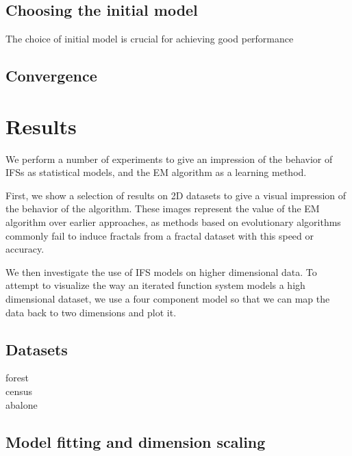 \documentclass[10pt,a4paper,oneside]{article}
\theoremstyle{definition}
\begin{document}

\subsection*{Choosing the initial model}

The choice of initial model is crucial for achieving good performance


\subsection*{Convergence}

\section*{Results}

We perform a number of experiments to give an impression of the behavior of IFSs as statistical models, and the EM algorithm as a learning method. 

First, we show a selection of results on 2D datasets to give a visual impression of the behavior of the algorithm. These images represent the value of the EM algorithm over earlier approaches, as methods based on evolutionary algorithms commonly fail to induce fractals from a fractal dataset with this speed or accuracy.

We then investigate the use of IFS models on higher dimensional data. To attempt to visualize the way an iterated function system models a high dimensional dataset, we use a four component model so that we can map the data back to two dimensions and plot it.

\subsection*{Datasets}

\begin{description}
  \item[forest]
  \item[census]
  \item[abalone]
\end{description}

\subsection*{Model fitting and dimension scaling}
\end{document}
